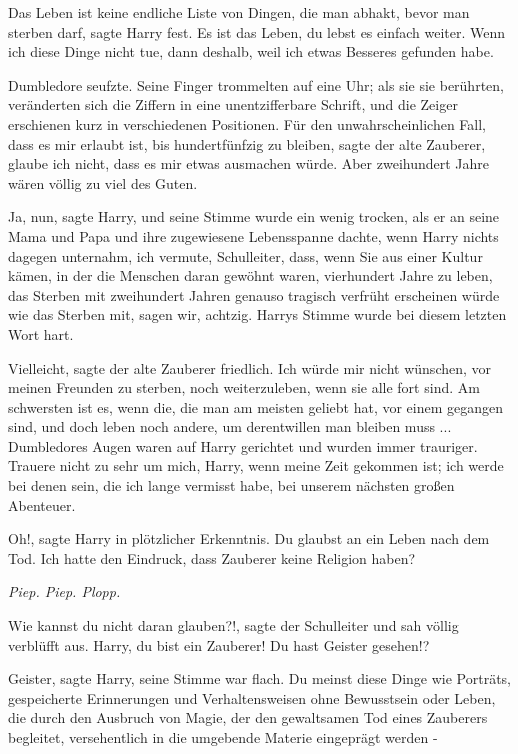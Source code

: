 \glqq{}Das Leben ist keine endliche Liste von Dingen, die man abhakt, bevor man
sterben darf\grqq{}, sagte Harry fest. \glqq{}Es ist das Leben, du lebst es
einfach weiter. Wenn ich diese Dinge nicht tue, dann deshalb, weil ich etwas
Besseres gefunden habe.\grqq{}

Dumbledore seufzte. Seine Finger trommelten auf eine Uhr; als sie sie berührten,
veränderten sich die Ziffern in eine unentzifferbare Schrift, und die Zeiger
erschienen kurz in verschiedenen Positionen. \glqq{}Für den unwahrscheinlichen
Fall, dass es mir erlaubt ist, bis hundertfünfzig zu bleiben\grqq{}, sagte der
alte Zauberer, \glqq{}glaube ich nicht, dass es mir etwas ausmachen würde. Aber
zweihundert Jahre wären völlig zu viel des Guten.\grqq{}

\glqq{}Ja, nun\grqq{}, sagte Harry, und seine Stimme wurde ein wenig trocken, als
er an seine Mama und Papa und ihre zugewiesene Lebensspanne dachte, wenn Harry
nichts dagegen unternahm, \glqq{}ich vermute, Schulleiter, dass, wenn Sie aus
einer Kultur kämen, in der die Menschen daran gewöhnt waren, vierhundert Jahre
zu leben, das Sterben mit zweihundert Jahren genauso tragisch verfrüht
erscheinen würde wie das Sterben mit, sagen wir,\emph{} achtzig.\grqq{} Harrys
Stimme wurde bei diesem letzten Wort hart.

\glqq{}Vielleicht\grqq{}, sagte der alte Zauberer friedlich. \glqq{}Ich würde mir
nicht wünschen, vor meinen Freunden zu sterben, noch weiterzuleben, wenn sie
alle fort sind. Am schwersten ist es, wenn die, die man am meisten geliebt hat,
vor einem gegangen sind, und doch leben noch andere, um derentwillen man bleiben
muss ...\grqq{} Dumbledores Augen waren auf Harry gerichtet und wurden immer
trauriger. \glqq{}Trauere nicht zu sehr um mich, Harry, wenn meine Zeit gekommen
ist; ich werde bei denen sein, die ich lange vermisst habe, bei unserem nächsten
großen Abenteuer.\grqq{}

\glqq{}Oh!\grqq{}, sagte Harry in plötzlicher Erkenntnis. \glqq{}Du glaubst an ein
Leben nach dem Tod. Ich hatte den Eindruck, dass Zauberer keine Religion
haben?\grqq{}

\emph{Piep. Piep. Plopp.}

\glqq{}Wie kannst du nicht daran glauben?!\grqq{}, sagte der Schulleiter und sah
völlig verblüfft aus. \glqq{}Harry, du bist ein Zauberer! Du hast Geister
gesehen!?\grqq{}

\glqq{}Geister\grqq{}, sagte Harry, seine Stimme war flach. \glqq{}Du meinst diese
Dinge wie Porträts, gespeicherte Erinnerungen und Verhaltensweisen ohne
Bewusstsein oder Leben, die durch den Ausbruch von Magie, der den gewaltsamen
Tod eines Zauberers begleitet, versehentlich in die umgebende Materie eingeprägt
werden -\grqq{}

